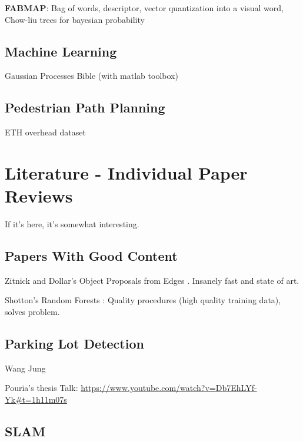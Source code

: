 \textbf{FABMAP}:
Bag of words,  descriptor, vector quantization into a visual word, Chow-liu trees for bayesian probability

\section{Machine Learning}
Gaussian Processes Bible (with matlab toolbox) \cite{rasmussen2006gaussian}


\section{Pedestrian Path Planning}
ETH overhead dataset \cite{pellegrini2009you}

\chapter{Literature - Individual Paper Reviews}

If it's here, it's somewhat interesting.
\section{Papers With Good Content}
Zitnick and Dollar's Object Proposals from Edges \cite{zitnick2014edge}. Insanely fast and state of art.

Shotton's Random Forests \cite{shotton2013real}: Quality procedures (high quality training data), solves problem.

\section{Parking Lot Detection}
Wang \cite{wang2014automatic}
Jung \cite{jung2014semiautomatic}

Pouria's thesis \cite{talebifard2014risk}
Talk: \url{https://www.youtube.com/watch?v=Db7EhLYf-Yk#t=1h11m07s}

\section{SLAM}

